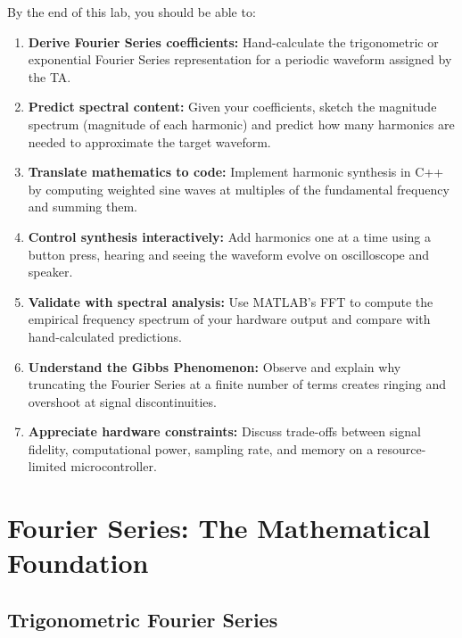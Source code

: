 \documentclass[11pt,letterpaper]{article}
\begin{document}
By the end of this lab, you should be able to:

\begin{enumerate}
    \item \textbf{Derive Fourier Series coefficients:} Hand-calculate the trigonometric or exponential Fourier Series representation for a periodic waveform assigned by the TA.

    \item \textbf{Predict spectral content:} Given your coefficients, sketch the magnitude spectrum (magnitude of each harmonic) and predict how many harmonics are needed to approximate the target waveform.

    \item \textbf{Translate mathematics to code:} Implement harmonic synthesis in C++ by computing weighted sine waves at multiples of the fundamental frequency and summing them.

    \item \textbf{Control synthesis interactively:} Add harmonics one at a time using a button press, hearing and seeing the waveform evolve on oscilloscope and speaker.

    \item \textbf{Validate with spectral analysis:} Use MATLAB's FFT to compute the empirical frequency spectrum of your hardware output and compare with hand-calculated predictions.

    \item \textbf{Understand the Gibbs Phenomenon:} Observe and explain why truncating the Fourier Series at a finite number of terms creates ringing and overshoot at signal discontinuities.

    \item \textbf{Appreciate hardware constraints:} Discuss trade-offs between signal fidelity, computational power, sampling rate, and memory on a resource-limited microcontroller.
\end{enumerate}

\clearpage

\section{Fourier Series: The Mathematical Foundation}

\subsection{Trigonometric Fourier Series}
\end{document}
